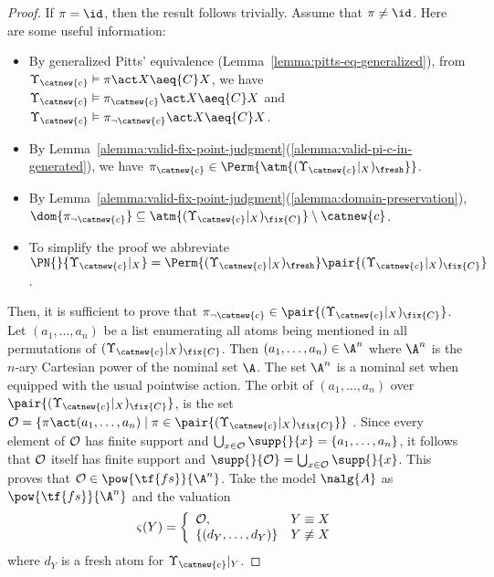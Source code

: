 \begin{proof}
If $\pi = \id$, then the result follows trivially. Assume that $\pi\neq \id$. Here are some useful information:

\begin{itemize}
    \item By generalized Pitts' equivalence (Lemma~\ref{lemma:pitts-eq-generalized}), from $\Upsilon_{\catnew{c}} \vDash \pi\act X\aeq{C} X$, we have $ \Upsilon_{\catnew{c}} \vDash \pi_{\catnew{c}}\act X\aeq{C} X$ and $\Upsilon_{\catnew{c}} \vDash \pi_{\neg\catnew{c}}\act X\aeq{C} X$.

    \item By Lemma~\ref{alemma:valid-fix-point-judgment}(\ref{alemma:valid-pi-c-in-generated}), we have $\pi_{\catnew{c}}\in \Perm{\atm{(\Upsilon_{\catnew{c}}|_X)_{\fresh}}}$.

    \item By Lemma~\ref{alemma:valid-fix-point-judgment}(\ref{alemma:domain-preservation}),  $\dom{\pi_{\neg\catnew{c}}} \subseteq\atm{(\Upsilon_{\catnew{c}}|_X)_{\fix{C}}}\setminus{\catnew{c}}$.

    \item To simplify the proof we abbreviate $\PN{}{\Upsilon_{\catnew{c}}|_X} = \Perm{(\Upsilon_{\catnew{c}}|_X)_{\fresh}}\pair{(\Upsilon_{\catnew{c}}|_X)_{\fix{C}}}$.
\end{itemize}

Then, it is sufficient to prove that $\pi_{\neg\catnew{c}} \in \pair{(\Upsilon_{\catnew{c}}|_X)_{\fix{C}}}$. Let $(a_1,\ldots,a_n)$ be a list enumerating all atoms being mentioned in all permutations of $(\Upsilon_{\catnew{c}}|_X)_{\fix{C}}$. Then $(a_1,\ldots,a_n) \in \A^n$ where $\A^n$ is the $n$-ary Cartesian power of the nominal set $\A$. The set $\A^n$ is a nominal set when equipped with the usual pointwise action. The orbit of $(a_1,\ldots,a_n)$ over $\pair{(\Upsilon_{\catnew{c}}|_X)_{\fix{C}}}$, is the set ${\cal O} = \{\pi\act (a_1,\ldots,a_n) \mid \pi\in \pair{(\Upsilon_{\catnew{c}}|_X)_{\fix{C}}}\}$ .
Since every element of ${\cal O}$ has finite support and $\bigcup_{x\in {\cal O}} \supp{}{x}  = \{a_1,\ldots,a_n\}$, it follows that ${\cal O}$ itself has finite support and $\supp{}{{\cal O}} = \bigcup_{x\in {\cal O}} \supp{}{x}$. This proves that ${\cal O}\in \pow{\tf{fs}}{\A^n}$. Take the model $\nalg{A}$ as $\pow{\tf{fs}}{\A^n}$ and the valuation
\[
    \varsigma(Y) = \left\{\begin{array}{lc}
        {\cal O}, & Y\equiv X \\
        \{(d_Y,\ldots,d_Y)\} & Y\not\equiv X
    \end{array}\right.
\]
where $d_Y$ is a fresh atom for $\Upsilon_{\catnew{c}}|_Y$.


\end{proof}
